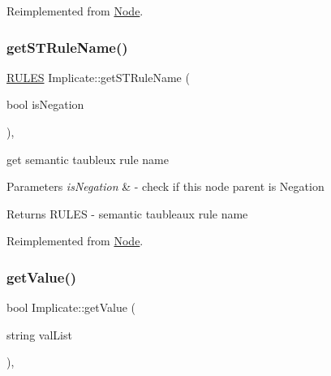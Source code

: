 Reimplemented from \hyperlink{class_node_a1009cb6d84206c2b5eaa86580da59a7c}{Node}.

\mbox{\label{class_implicate_aa425e8cb25aec8dd2935346f61ebaefa}} 
\subsubsection{\texorpdfstring{get\+S\+T\+Rule\+Name()}{getSTRuleName()}}
{\footnotesize\ttfamily \hyperlink{proposition_2tableaux_2enum_8h_a70c93904c6a27d228050f922eb4fc3b8}{R\+U\+L\+ES} Implicate\+::get\+S\+T\+Rule\+Name (\begin{DoxyParamCaption}\item[{bool}]{is\+Negation }\end{DoxyParamCaption})\hspace{0.3cm}{\ttfamily [override]}, {\ttfamily [virtual]}}



get semantic taubleux rule name 


\begin{DoxyParams}{Parameters}
{\em is\+Negation} & -\/ check if this node parent is Negation \\
\hline
\end{DoxyParams}
\begin{DoxyReturn}{Returns}
R\+U\+L\+ES -\/ semantic taubleaux rule name 
\end{DoxyReturn}


Reimplemented from \hyperlink{class_node_a25b6581950988c2536a392a6874c8072}{Node}.

\mbox{\label{class_implicate_a331e1a1fcbe378ef15a3a7f04b7034d5}} 
\subsubsection{\texorpdfstring{get\+Value()}{getValue()}}
{\footnotesize\ttfamily bool Implicate\+::get\+Value (\begin{DoxyParamCaption}\item[{string}]{val\+List }\end{DoxyParamCaption})\hspace{0.3cm}{\ttfamily [override]}, {\ttfamily [virtual]}}



